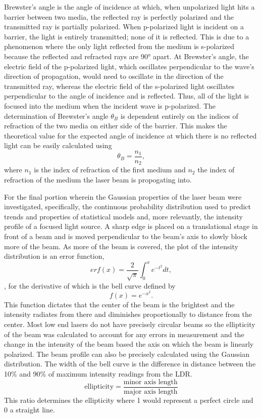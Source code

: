 \documentclass[11pt]{article}
\begin{document}
Brewster's angle is the angle of incidence at which, when unpolarized
light hits a barrier between two media, the reflected ray is perfectly
polarized and the transmitted ray is partially polarized. When
p-polarized light is incident on a barrier, the light is entirely
transmitted; none of it is reflected. This is due to a phenomenon where
the only light reflected from the medium is s-polarized because the
reflected and refracted rays are 90° apart. At Brewster's angle, the
electric field of the p-polarized light, which oscillates perpendicular
to the wave's direction of propagation, would need to oscillate in the
direction of the transmitted ray, whereas the electric field of the
s-polarized light oscillates perpendicular to the angle of incidence and
is reflected. Thus, all of the light is focused into the medium when the
incident wave is p-polarized. The determination of Brewster's angle
\(\theta_B\) is dependent entirely on the indices of refraction of the
two media on either side of the barrier. This makes the theoretical
value for the expected angle of incidence at which there is no reflected
light can be easily calculated using
\[\theta_{B} = \frac{n_{1}}{n_{2}}, \tag{2}\] where \(n_1\) is the index
of refraction of the first medium and \(n_2\) the index of refraction of
the medium the laser beam is propogating into.

For the final portion wherein the Gaussian properties of the laser beam
were investigated, specifically, the continuous probability distribution
used to predict trends and properties of statistical models and, more
relevantly, the intensity profile of a focused light source. A sharp
edge is placed on a translational stage in front of a beam and is moved
perpendicular to the beam's axis to slowly block more of the beam. As
more of the beam is covered, the plot of the intensity distribution is
an error function,
\[erf(x) = \frac{2}{\sqrt{\pi}}\int_0^x e^{-t^2} dt , \tag{3}\], for the
derivative of which is the bell curve defined by
\[f(x) = e^{-x^2}. \tag{4}\] This function dictates that the center of
the beam is the brightest and the intensity radiates from there and
diminishes proportionally to distance from the center. Most low end
lasers do not have precisely circular beams so the ellipticity of the
beam was calculated to account for any errors in measurement and the
change in the intensity of the beam based the axis on which the beam is
linearly polarized. The beam profile can also be precisely calculated
using the Gaussian distribution. The width of the bell curve is the
difference in distance between the 10\% and 90\% of maximum intensity
readings from the LDR.
\[\text{ellipticity} = \frac{\text{minor axis length}}{\text{major axis length}} \tag{5}\]
This ratio determines the ellipticity where 1 would represent a perfect
circle and 0 a straight line.
\end{document}
